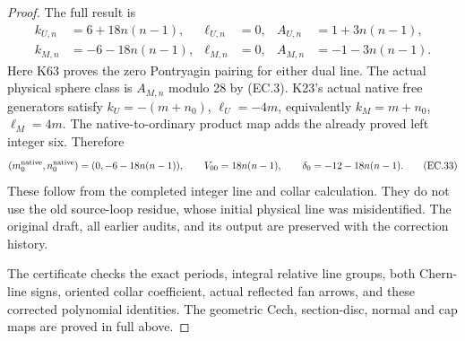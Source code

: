 \begin{proof}
The full result is
\[
 \begin{aligned}
 k_{U,n}&=6+18n(n-1),&\ell_{U,n}&=0,
      &A_{U,n}&=1+3n(n-1),\\
 k_{M,n}&=-6-18n(n-1),&\ell_{M,n}&=0,
      &A_{M,n}&=-1-3n(n-1).
 \end{aligned}                                                   \tag{EC.32}
\]
Here K63 proves the zero Pontryagin pairing for either dual line.
The actual physical sphere class is \(A_{M,n}\) modulo 28 by
(EC.3). K23's actual native free generators satisfy
\(k_U=-(m+n_0)\), \(\ell_U=-4m\), equivalently
\(k_M=m+n_0\), \(\ell_M=4m\). The native-to-ordinary product
map adds the already proved left integer six. Therefore
\[
 (m_0^{\rm native},n_0^{\rm native})
          =(0,-6-18n(n-1)),\qquad
 V_{00}=18n(n-1),\qquad \delta_0=-12-18n(n-1).            \tag{EC.33}
\]
These follow from the completed integer line and collar calculation.
They do not use the old source-loop residue, whose initial physical
line was misidentified. The original draft, all earlier audits,
and its output are preserved with the correction history.

The certificate  checks
the exact periods, integral relative line groups, both Chern-line
signs, oriented collar coefficient, actual reflected fan arrows,
and these corrected polynomial identities. The geometric Cech,
section-disc, normal and cap maps are proved in full above.
\end{proof}
